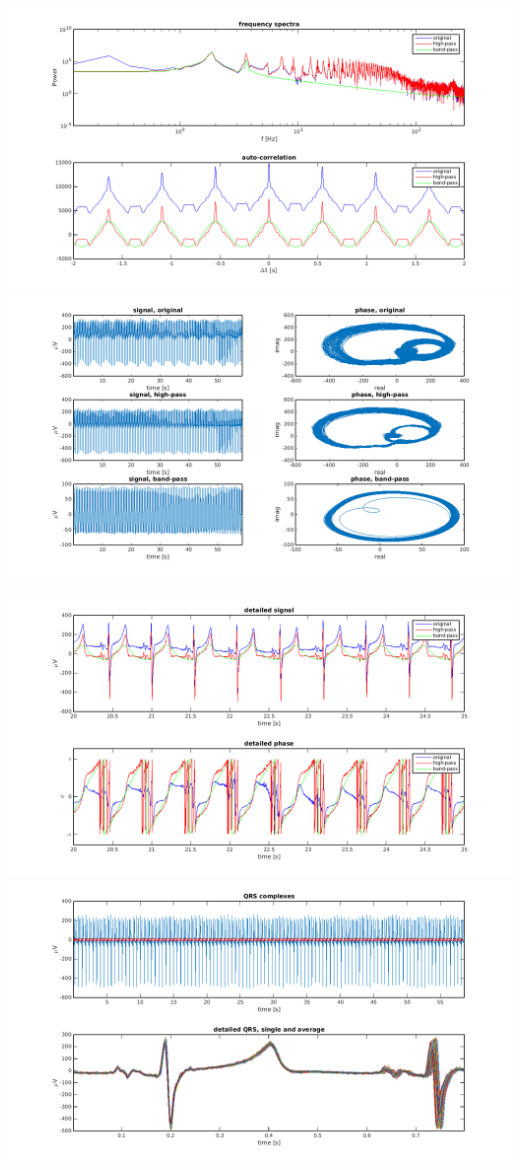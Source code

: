 \documentclass[10pt,a4paper,notitlepage]{report}
\begin{document}
\vspace{1cm}
\hspace{-1cm} \includegraphics[scale=0.25]{p2fig1.png}
\includegraphics[scale=0.25]{p2fig2.png}

\hspace{-1cm} \includegraphics[scale=0.25]{p2fig3.png}
\includegraphics[scale=0.25]{p2fig4.png}
\end{document}
